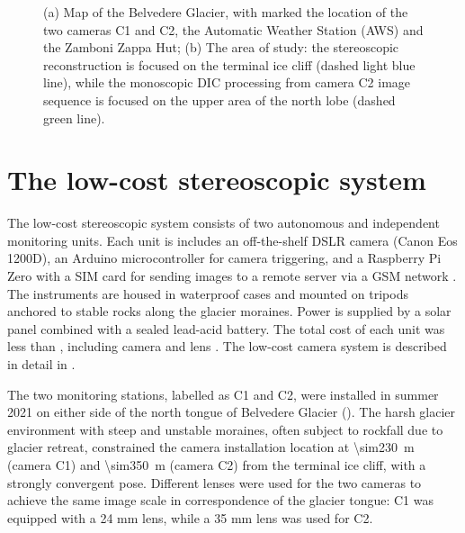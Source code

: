 \begin{figure}
  \centering
  \caption{(a) Map of the Belvedere Glacier, with marked the location of the two cameras C1 and C2, the Automatic Weather Station (AWS) and the Zamboni Zappa Hut;
  (b) The area of study: the stereoscopic reconstruction is focused on the terminal ice cliff (dashed light blue line), while the monoscopic DIC processing from camera C2 image sequence is focused on the upper area of the north lobe (dashed green line).}
  \label{fig:4:studyarea}
\end{figure}

\section{The low-cost stereoscopic system}\label{sec:4:system}

The low-cost stereoscopic system consists of two autonomous and independent monitoring
units. Each unit is includes an off-the-shelf DSLR camera (Canon Eos 1200D), an Arduino
microcontroller for camera triggering, and a Raspberry Pi
Zero with a SIM card for sending images to a remote server via a GSM
network \citep{ioli2023_replicable}.
The instruments are housed in waterproof cases and mounted on tripods anchored to stable
rocks along the glacier moraines.
Power is supplied by a solar panel combined with a sealed lead-acid battery.
The total cost of each unit was less than , including
camera and lens \citep{ioli2023_replicable}.
The low-cost camera system is described in detail in \citet{ioli2023_replicable}.

The two monitoring stations, labelled as C1 and C2, were installed in summer 2021 on
either side of the north tongue of Belvedere Glacier ().
The harsh glacier environment with steep and unstable moraines, often subject to rockfall
due to glacier retreat, constrained the camera installation location at
\SI{\sim230}{\meter} (camera C1) and \SI{\sim350}{\meter} (camera C2) from the terminal
ice cliff, with a strongly convergent pose.
Different lenses were used for the two cameras to achieve the same image scale in
correspondence of the glacier tongue: C1 was equipped with a 24 mm lens, while a 35 mm
lens was used for C2.

